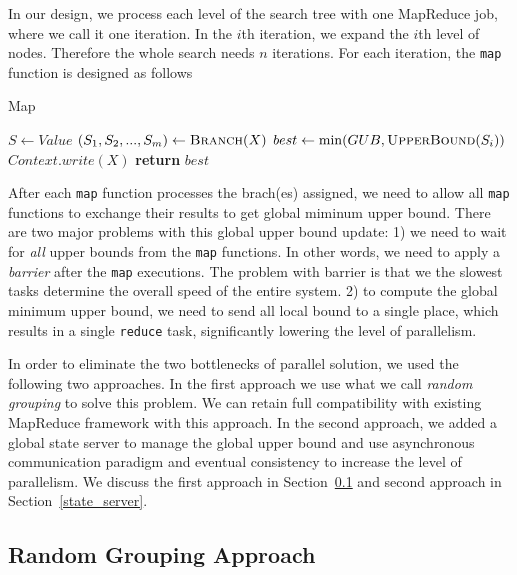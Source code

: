 In our design, we process each level of the search tree with one MapReduce job, where we call it one iteration. In the $i$th iteration, we expand the $i$th level of nodes. Therefore the whole search needs $n$ iterations. For each iteration, the \texttt{map} function is designed as follows
\begin{algorithm}
\caption{Map}
\begin{algorithmic}[1]
    \State $S \gets Value$
    \State $(S_1,S_2,...,S_m) \gets \textsc{Branch}(X)$
        \State $best \gets \min(GUB, \textsc{UpperBound}(S_i))$
    \EndFor
            \State $Context.write(X)$
        \EndIf
    \EndFor
    \State \textbf{return }$best$
\EndFunction
\end{algorithmic}
\end{algorithm}


After each \texttt{map} function processes the brach(es) assigned, we need to allow all \texttt{map} functions to exchange their results to get global miminum upper bound. There are two major problems with this global upper bound update: 1) we need to wait for \emph{all} upper bounds from the \texttt{map} functions. In other words, we need to apply a \emph{barrier} after the \texttt{map} executions. The problem with barrier is that we the slowest tasks determine the overall speed of the entire system. 2) to compute the global minimum upper bound, we need to send all local bound to a single place, which results in a single \texttt{reduce} task, significantly lowering the level of parallelism.

In order to eliminate the two bottlenecks of parallel solution, we used the following two approaches. In the first approach we use what we call \textit{random grouping} to solve this problem. We can retain full compatibility with existing MapReduce framework with this approach. In the second approach, we added a global state server to manage the global upper bound and use asynchronous communication paradigm and eventual consistency to increase the level of parallelism.  We discuss the first approach in Section~\ref{random_group} and second approach in Section~\ref{state_server}.


\subsection{Random Grouping Approach}
\label{random_group}

